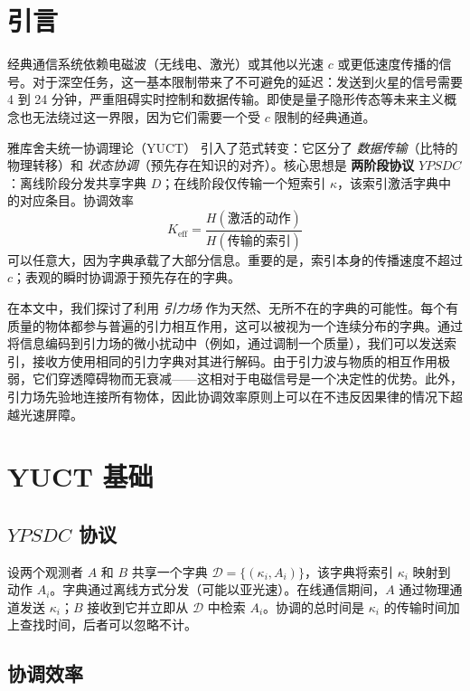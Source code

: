 \documentclass[12pt,a4paper]{article}
\newcommand{\Keff}{K_{\mathrm{eff}}}
\newcommand{\YPSDC}{YPSDC}
\begin{document}
	\section{引言}
	\label{sec:intro}
	
	经典通信系统依赖电磁波（无线电、激光）或其他以光速 \(c\) 或更低速度传播的信号。对于深空任务，这一基本限制带来了不可避免的延迟：发送到火星的信号需要 4 到 24 分钟，严重阻碍实时控制和数据传输。即使是量子隐形传态等未来主义概念也无法绕过这一界限，因为它们需要一个受 \(c\) 限制的经典通道。
	
	雅库舍夫统一协调理论（YUCT）\cite{Yakushev2026} 引入了范式转变：它区分了 \emph{数据传输}（比特的物理转移）和 \emph{状态协调}（预先存在知识的对齐）。核心思想是 \textbf{两阶段协议} \(\YPSDC\)：离线阶段分发共享字典 \(D\)；在线阶段仅传输一个短索引 \(\kappa\)，该索引激活字典中的对应条目。协调效率
	\begin{equation}
		\Keff = \frac{H(\text{激活的动作})}{H(\text{传输的索引})}
	\end{equation}
	可以任意大，因为字典承载了大部分信息。重要的是，索引本身的传播速度不超过 \(c\)；表观的瞬时协调源于预先存在的字典。
	
	在本文中，我们探讨了利用 \emph{引力场} 作为天然、无所不在的字典的可能性。每个有质量的物体都参与普遍的引力相互作用，这可以被视为一个连续分布的字典。通过将信息编码到引力场的微小扰动中（例如，通过调制一个质量），我们可以发送索引，接收方使用相同的引力字典对其进行解码。由于引力波与物质的相互作用极弱，它们穿透障碍物而无衰减——这相对于电磁信号是一个决定性的优势。此外，引力场先验地连接所有物体，因此协调效率原则上可以在不违反因果律的情况下超越光速屏障。
	
	\section{YUCT 基础}
	\label{sec:foundations}
	
	\subsection{\(\YPSDC\) 协议}
	\label{subsec:ypsdc}
	
	设两个观测者 \(A\) 和 \(B\) 共享一个字典 \(\mathcal{D} = \{ (\kappa_i, A_i) \}\)，该字典将索引 \(\kappa_i\) 映射到动作 \(A_i\)。字典通过离线方式分发（可能以亚光速）。在线通信期间，\(A\) 通过物理通道发送 \(\kappa_i\)；\(B\) 接收到它并立即从 \(\mathcal{D}\) 中检索 \(A_i\)。协调的总时间是 \(\kappa_i\) 的传输时间加上查找时间，后者可以忽略不计。
	
	\subsection{协调效率}
	\label{subsec:keff}
	
\end{document}
